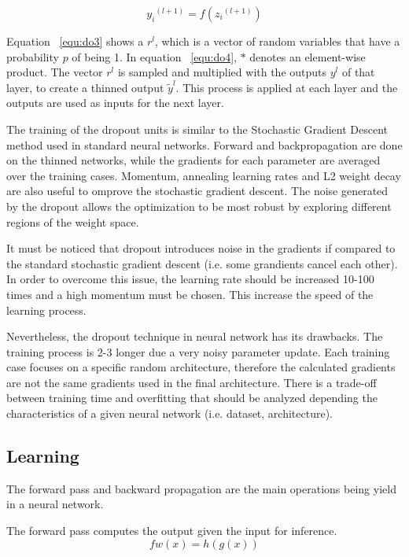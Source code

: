 \begin{equation}
 {y_i}^{(l+1)} = f({z_i}^{(l+1)})
 \label{equ:do6}
\end{equation}

Equation ~\ref{equ:do3} shows a $r^l$, which is a vector of random variables that have a probability $p$ of being 1. In equation ~\ref{equ:do4}, $\ast$ denotes an element-wise product. The vector $r^l$ is sampled and multiplied with the outputs $y^l$ of that layer, to create a thinned output $\tilde{y}^l$. This process is applied at each layer and the outputs are used as inputs for the next layer.

The training of the dropout units is similar to the Stochastic Gradient Descent method used in standard neural networks. Forward and backpropagation are done on the thinned networks, while the gradients for each parameter are averaged over the training cases. Momentum, annealing learning rates and L2 weight decay are also useful to omprove the stochastic gradient descent. The noise generated by the dropout allows the optimization to be most robust by exploring different regions of the weight space. 

It must be noticed that dropout introduces noise in the gradients if compared to the standard stochastic gradient descent (i.e. some grandients cancel each other). In order to overcome this issue, the learning rate should be increased 10-100 times and a high momentum must be chosen. This increase the speed of the learning process.

Nevertheless, the dropout technique in neural network has its drawbacks. The training process is 2-3 longer due a very noisy parameter update. Each training case focuses on a specific random architecture, therefore the calculated gradients are not the same gradients used in the final architecture. There is a trade-off between training time and overfitting that should be analyzed depending the characteristics of a given neural network (i.e. dataset, architecture).    

\subsection{Learning}
The forward pass and backward propagation are the main operations being yield in a neural network.

The forward pass computes the output given the input for inference.
\begin{equation}
 fw(x) = h(g(x))
 \label{equ:FWD}
\end{equation}

